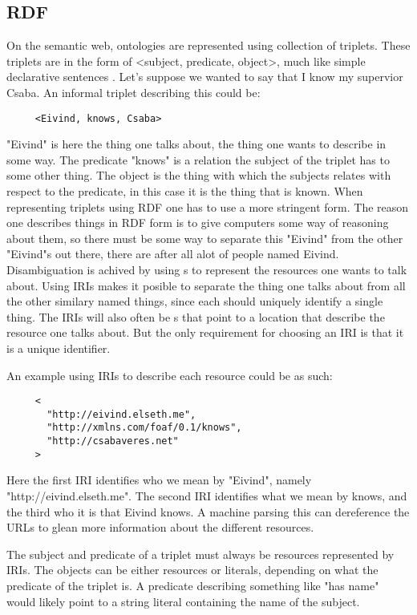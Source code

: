\subsection{RDF}
On the semantic web, ontologies are represented using collection of  triplets.
These triplets are in the form of <subject, predicate, object>, much like simple declarative sentences \citep{Berners-Lee2001}.
Let's suppose we wanted to say that I know my supervior Csaba.
An informal triplet describing this could be:
\begin{verbatim}
     <Eivind, knows, Csaba>
\end{verbatim}
"Eivind" is here the thing one talks about, the thing one wants to describe in some way.
The predicate "knows" is a relation the subject of the triplet has to some other thing.
The object is the thing with which the subjects relates with respect to the predicate, in this case it is the thing that is known.
When representing triplets using RDF one has to use a more stringent form.
The reason one describes things in RDF form is to give computers some way of reasoning about them,
so there must be some way to separate this "Eivind" from the other "Eivind"s out there,
there are after all alot of people named Eivind.
Disambiguation is achived by using s to represent the resources one wants to talk about.
Using IRIs makes it posible to separate the thing one talks about from all the other similary named things,
since each should uniquely identify a single thing.
The IRIs will also often be s
that point to a location that describe the resource one talks about.
But the only requirement for choosing an IRI is that it is a unique identifier.

An example using IRIs to describe each resource could be as such:
\begin{verbatim}
     <
       "http://eivind.elseth.me",
       "http://xmlns.com/foaf/0.1/knows",
       "http://csabaveres.net"
     >
\end{verbatim}
Here the first IRI identifies who we mean by "Eivind", namely "http://eivind.elseth.me".
The second IRI identifies what we mean by knows, and the third who it is that Eivind knows.
A machine parsing this can dereference the URLs to glean more information about the different resources.

The subject and predicate of a triplet must always be resources represented by IRIs.
The objects can be either resources or literals, depending on what the predicate of the triplet is.
A predicate describing something like "has name" would likely point to a string literal containing the name of the subject\citep{Hebeler2009Chp3}.

